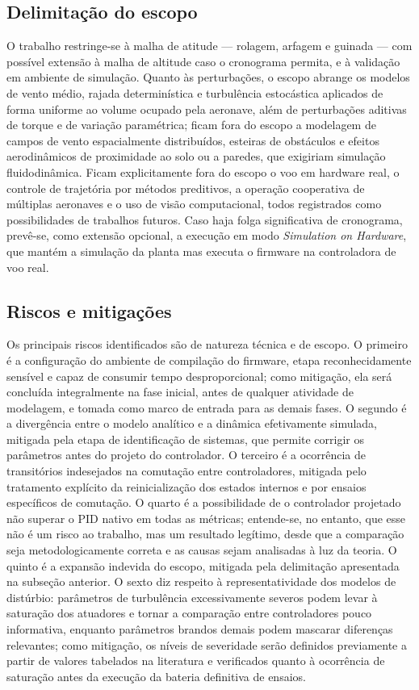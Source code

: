\documentclass[12pt,a4paper]{article}
\begin{document}
\subsection{Delimitação do escopo}

O trabalho restringe-se à malha de atitude --- rolagem, arfagem e guinada --- com
possível extensão à malha de altitude caso o cronograma permita, e à validação em
ambiente de simulação. Quanto às perturbações, o escopo abrange os modelos de vento
médio, rajada determinística e turbulência estocástica aplicados de forma uniforme ao
volume ocupado pela aeronave, além de perturbações aditivas de torque e de variação
paramétrica; ficam fora do escopo a modelagem de campos de vento espacialmente
distribuídos, esteiras de obstáculos e efeitos aerodinâmicos de proximidade ao solo
ou a paredes, que exigiriam simulação fluidodinâmica. Ficam explicitamente fora do escopo o voo em hardware real, o
controle de trajetória por métodos preditivos, a operação cooperativa de múltiplas
aeronaves e o uso de visão computacional, todos registrados como possibilidades de
trabalhos futuros. Caso haja folga significativa de cronograma, prevê-se, como
extensão opcional, a execução em modo \emph{Simulation on Hardware}, que mantém a
simulação da planta mas executa o firmware na controladora de voo real.

\subsection{Riscos e mitigações}

Os principais riscos identificados são de natureza técnica e de escopo. O primeiro é
a configuração do ambiente de compilação do firmware, etapa reconhecidamente
sensível e capaz de consumir tempo desproporcional; como mitigação, ela será
concluída integralmente na fase inicial, antes de qualquer atividade de modelagem, e
tomada como marco de entrada para as demais fases. O segundo é a divergência entre o
modelo analítico e a dinâmica efetivamente simulada, mitigada pela etapa de
identificação de sistemas, que permite corrigir os parâmetros antes do projeto do
controlador. O terceiro é a ocorrência de transitórios indesejados na comutação entre
controladores, mitigada pelo tratamento explícito da reinicialização dos estados
internos e por ensaios específicos de comutação. O quarto é a possibilidade de o
controlador projetado não superar o PID nativo em todas as métricas; entende-se, no
entanto, que esse não é um risco ao trabalho, mas um resultado legítimo, desde que a
comparação seja metodologicamente correta e as causas sejam analisadas à luz da
teoria. O quinto é a expansão indevida do escopo, mitigada pela delimitação
apresentada na subseção anterior. O sexto diz respeito à representatividade dos
modelos de distúrbio: parâmetros de turbulência excessivamente severos podem levar à
saturação dos atuadores e tornar a comparação entre controladores pouco informativa,
enquanto parâmetros brandos demais podem mascarar diferenças relevantes; como
mitigação, os níveis de severidade serão definidos previamente a partir de valores
tabelados na literatura e verificados quanto à ocorrência de saturação antes da
execução da bateria definitiva de ensaios.
\end{document}
